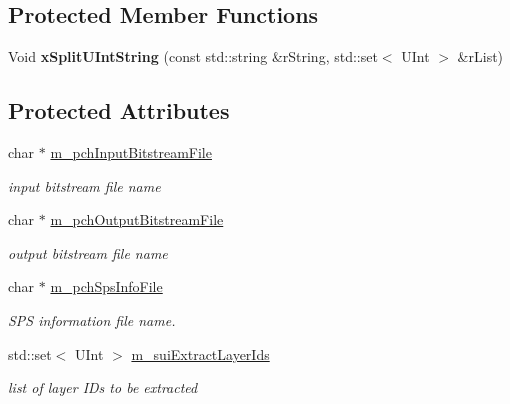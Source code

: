 \subsection*{Protected Member Functions}
\begin{DoxyCompactItemize}
\item 
\mbox{\label{class_t_app_extr_cfg_af7d15ab7be4ac9e45fabf70837fa1dff}} 
Void {\bfseries x\+Split\+U\+Int\+String} (const std\+::string \&r\+String, std\+::set$<$ U\+Int $>$ \&r\+List)
\end{DoxyCompactItemize}
\subsection*{Protected Attributes}
\begin{DoxyCompactItemize}
\item 
\mbox{\label{class_t_app_extr_cfg_a5cdb1478553151628e90d275509830ca}} 
char $\ast$ \hyperlink{class_t_app_extr_cfg_a5cdb1478553151628e90d275509830ca}{m\+\_\+pch\+Input\+Bitstream\+File}
\begin{DoxyCompactList}\small\item\em input bitstream file name \end{DoxyCompactList}\item 
\mbox{\label{class_t_app_extr_cfg_a3a3e20c8135ebed37ccc28e1c89f4169}} 
char $\ast$ \hyperlink{class_t_app_extr_cfg_a3a3e20c8135ebed37ccc28e1c89f4169}{m\+\_\+pch\+Output\+Bitstream\+File}
\begin{DoxyCompactList}\small\item\em output bitstream file name \end{DoxyCompactList}\item 
\mbox{\label{class_t_app_extr_cfg_a3b438d9d5251f603f17a2e2e4cedd92a}} 
char $\ast$ \hyperlink{class_t_app_extr_cfg_a3b438d9d5251f603f17a2e2e4cedd92a}{m\+\_\+pch\+Sps\+Info\+File}
\begin{DoxyCompactList}\small\item\em S\+PS information file name. \end{DoxyCompactList}\item 
\mbox{\label{class_t_app_extr_cfg_affbe580c06d213fba837784ce6d5bc20}} 
std\+::set$<$ U\+Int $>$ \hyperlink{class_t_app_extr_cfg_affbe580c06d213fba837784ce6d5bc20}{m\+\_\+sui\+Extract\+Layer\+Ids}
\begin{DoxyCompactList}\small\item\em list of layer I\+Ds to be extracted \end{DoxyCompactList}\end{DoxyCompactItemize}


